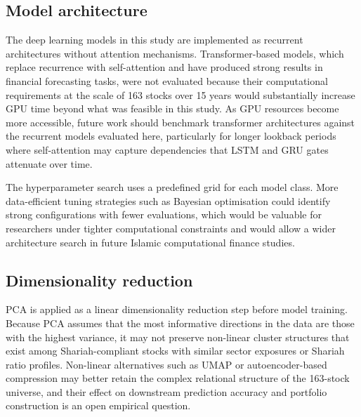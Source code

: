 \subsection{Model architecture}

The deep learning models in this study are implemented as recurrent architectures
without attention mechanisms. Transformer-based models, which replace recurrence
with self-attention and have produced strong results in financial forecasting tasks,
were not evaluated because their computational requirements at the scale of 163
stocks over 15 years would substantially increase GPU time beyond what was
feasible in this study. As GPU resources become more accessible, future work
should benchmark transformer architectures \citep{vaswani2017attention} against
the recurrent models evaluated here, particularly for longer lookback periods where
self-attention may capture dependencies that LSTM and GRU gates attenuate over time.

The hyperparameter search uses a predefined grid for each model class. More
data-efficient tuning strategies such as Bayesian optimisation
\citep{bergstra2012random} could identify strong configurations with fewer
evaluations, which would be valuable for researchers under tighter computational
constraints and would allow a wider architecture search in future Islamic
computational finance studies.

\subsection{Dimensionality reduction}

PCA is applied as a linear dimensionality reduction step before model training.
Because PCA assumes that the most informative directions in the data are those
with the highest variance, it may not preserve non-linear cluster structures that
exist among Shariah-compliant stocks with similar sector exposures or Shariah
ratio profiles. Non-linear alternatives such as UMAP or autoencoder-based
compression may better retain the complex relational structure of the 163-stock
universe, and their effect on downstream prediction accuracy and portfolio
construction is an open empirical question.
